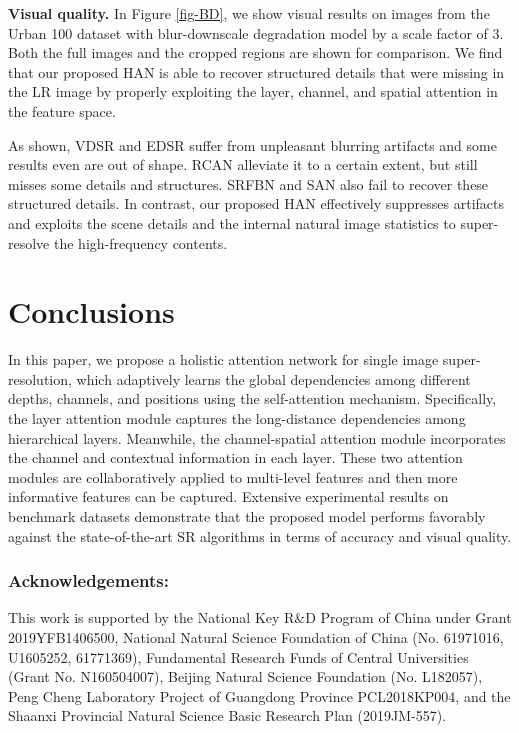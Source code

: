 \documentclass[runningheads]{llncs}
\begin{document}
\textbf{Visual quality.} In Figure \ref{fig-BD}, we show visual results on images from the Urban 100 dataset with blur-downscale degradation model by a scale factor of 3. Both the full images and the cropped regions are shown for comparison. 
We find that our proposed HAN is able to recover structured details that were missing in the LR image by properly exploiting the layer, channel, and spatial attention in the feature space.


As shown, VDSR and EDSR suffer from unpleasant blurring artifacts and some results even are out of shape. RCAN alleviate it to a certain extent, but still misses some details and structures.
SRFBN and SAN also fail to recover these structured details. 
In contrast, our proposed HAN effectively suppresses artifacts and exploits the scene details and the internal natural image statistics to super-resolve the high-frequency contents.





\section{Conclusions}
In this paper, we propose a holistic attention network for single image super-resolution, which adaptively learns the global dependencies among different depths, channels, and positions using the self-attention mechanism. 
Specifically, the layer attention module captures the long-distance dependencies among hierarchical layers. Meanwhile, the channel-spatial attention module incorporates the
channel and contextual information in each layer. 
These two attention modules are collaboratively applied to multi-level features and then more informative features can be captured.
Extensive experimental results on benchmark datasets demonstrate that the proposed model performs favorably against the state-of-the-art SR algorithms in terms of accuracy and visual quality.


\subsubsection{Acknowledgements:}
This work is supported by the National Key R\&D Program of China under Grant 2019YFB1406500, National Natural Science Foundation of China (No. 61971016, U1605252, 61771369), Fundamental Research Funds of Central Universities (Grant No. N160504007), Beijing Natural Science Foundation (No. L182057), Peng Cheng Laboratory Project of Guangdong Province PCL2018KP004, and the Shaanxi Provincial Natural Science Basic Research Plan (2019JM-557). 
\clearpage





\end{document}
